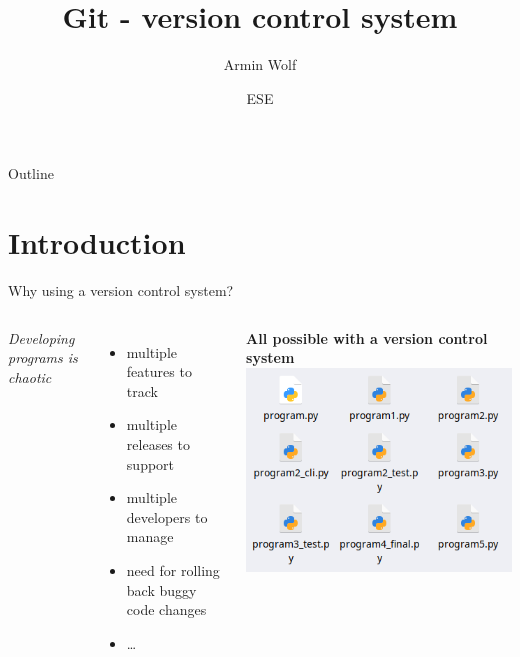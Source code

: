 \documentclass[10pt, graphics, aspectratio=169, table]{beamer}
\title{Git - version control system}
\author{Armin Wolf}
\date{ESE \the\year{}}
\institute{Nerd::101 - ESE - IFSR - TU Dresden}
\begin{document}
    \maketitle

    \begin{frame}{Outline}
        \tableofcontents
    \end{frame}


    \section{Introduction}
    \begin{frame}{Why using a version control system?}
        \begin{columns}
                \emph{Developing programs is chaotic}
                \begin{itemize}
                    \item multiple features to track
                    \item multiple releases to support
                    \item multiple developers to manage
                    \item need for rolling back buggy code changes
                    \item \ldots
                \end{itemize}
                \textbf{All possible with a version control system}
                \includegraphics[width=\textwidth]{img/chaos.png}
        \end{columns}
    \end{frame}
\end{document}
